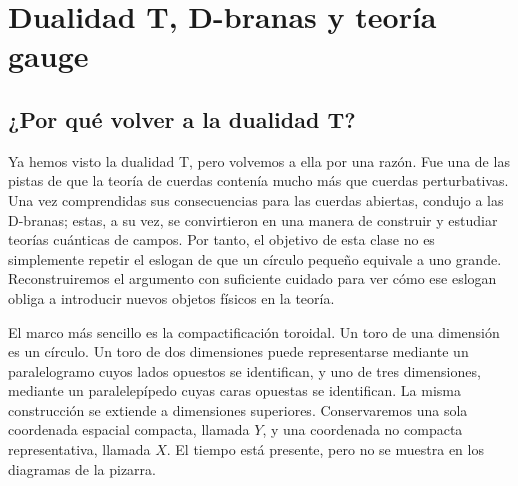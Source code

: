 \chapter{Dualidad T, D-branas y teoría gauge}


\section{¿Por qué volver a la dualidad T?}

Ya hemos visto la dualidad T, pero volvemos a ella por una razón. Fue una de las pistas de que la teoría de cuerdas contenía mucho más que cuerdas perturbativas. Una vez comprendidas sus consecuencias para las cuerdas abiertas, condujo a las D-branas; estas, a su vez, se convirtieron en una manera de construir y estudiar teorías cuánticas de campos. Por tanto, el objetivo de esta clase no es simplemente repetir el eslogan de que un círculo pequeño equivale a uno grande. Reconstruiremos el argumento con suficiente cuidado para ver cómo ese eslogan obliga a introducir nuevos objetos físicos en la teoría.

El marco más sencillo es la compactificación toroidal. Un toro de una dimensión es un círculo. Un toro de dos dimensiones puede representarse mediante un paralelogramo cuyos lados opuestos se identifican, y uno de tres dimensiones, mediante un paralelepípedo cuyas caras opuestas se identifican. La misma construcción se extiende a dimensiones superiores. Conservaremos una sola coordenada espacial compacta, llamada \(Y\), y una coordenada no compacta representativa, llamada \(X\). El tiempo está presente, pero no se muestra en los diagramas de la pizarra.

